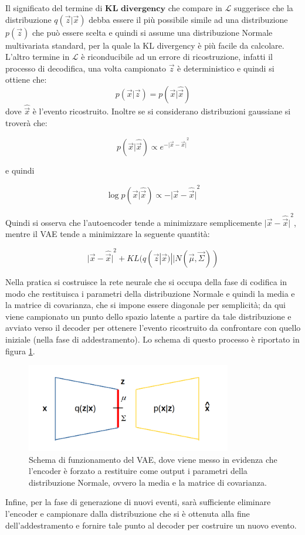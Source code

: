 Il significato del termine di $\textbf{KL divergency}$ che compare in $\mathcal{L}$ suggerisce che la distribuzione $q(\vec{z}|\vec{x})$ debba essere il più possibile simile ad una distribuzione $p(\vec{z})$ che può essere scelta e quindi si assume una distribuzione Normale multivariata standard, per la quale la KL divergency è più facile da calcolare. \\
L'altro termine in $\mathcal{L}$ è riconducibile ad un errore di ricostruzione, infatti il processo di decodifica, una volta campionato $\vec{z}$ è deterministico e quindi si ottiene che:
\begin{equation}
	p(\vec{x}|\vec{z}) = p(\vec{x}|\hat{\vec{x}})
\end{equation}
dove $\hat{\vec{x}}$ è l'evento ricostruito. Inoltre se si considerano distribuzioni gaussiane si troverà che:

\begin{equation}
	p(\vec{x}|\hat{\vec{x}}) \propto e^{{-{\lvert \vec{x}-\hat{\vec{x}}} \rvert}^2}
\end{equation}

e quindi

\begin{equation}
	\log p(\vec{x}|\hat{\vec{x}}) \propto -{\lvert \vec{x}-\hat{\vec{x}} \rvert}^2
\end{equation}

Quindi si osserva che l'autoencoder tende a minimizzare semplicemente ${\lvert \vec{x}-\hat{\vec{x}} \rvert}^2$, mentre il VAE tende a minimizzare la seguente quantità:

\begin{equation}
	{\lvert \vec{x}-\hat{\vec{x}} \rvert}^2 + KL (q(\vec{z}|\vec{x})||N(\vec{\mu},\vec{\Sigma}))
\end{equation}

Nella pratica si costruisce la rete neurale che si occupa della fase di codifica in modo che restituisca i parametri della distribuzione Normale e quindi la media e la matrice di covarianza, che si impone essere diagonale per semplicità; da qui viene campionato un punto dello spazio latente a partire da tale distribuzione e avviato verso il decoder per ottenere l'evento ricostruito da confrontare con quello iniziale (nella fase di addestramento). Lo schema di questo processo è riportato in figura \ref{schemaVAEs}.
\newpage

\begin{figure}[h!]
	\centering		\includegraphics[width=0.80\textwidth]{figs/VAEgauss.png}
	\caption{Schema di funzionamento del VAE, dove viene messo in evidenza che l'encoder è forzato a restituire come output i parametri della distribuzione Normale, ovvero la media e la matrice di covarianza.}
	\label{schemaVAEs}
\end{figure}


Infine, per la fase di generazione di nuovi eventi, sarà sufficiente eliminare l'encoder e campionare dalla distribuzione che si è ottenuta alla fine dell'addestramento e fornire tale punto al decoder per costruire un nuovo evento.

\newpage